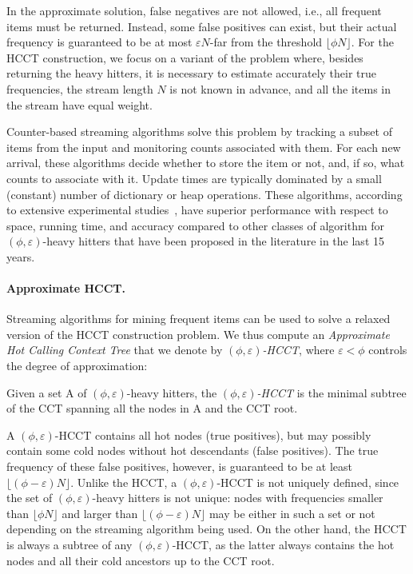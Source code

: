 \noindent In the approximate solution, false negatives are not allowed, i.e., all frequent items must be returned. Instead, some false positives can exist, but their actual frequency is guaranteed to be at most $\varepsilon N$-far from the threshold $\lfloor\phi N\rfloor$. For the HCCT construction, we focus on a variant of the problem where, besides returning the heavy hitters, it is necessary to estimate accurately their true frequencies, the stream length $N$ is not known in advance, and all the items in the stream have equal weight.

Counter-based streaming algorithms solve this problem by tracking a subset of items from the input and monitoring counts associated with them. For each new arrival, these algorithms decide whether to store the item or not, and, if so, what counts to associate with it. Update times are typically dominated by a small (constant) number of dictionary or heap operations. These algorithms, according to extensive experimental studies~\cite{Cormode08,Manerikar2009}, have superior performance with respect to space, running time, and accuracy compared to other classes of algorithm for $(\phi,\varepsilon)$-heavy hitters that have been proposed in the literature in the last 15 years.

\paragraph*{Approximate HCCT.} Streaming algorithms for mining frequent items can be used to solve a relaxed version of the HCCT construction problem. We thus compute an {\em Approximate Hot Calling Context Tree} that we denote by {\em $(\phi,\varepsilon)$-HCCT}, where $\varepsilon<\phi$ controls the degree of approximation:

\begin{definition}
Given a set A of $(\phi,\varepsilon)$-heavy hitters, the {\em $(\phi,\varepsilon)$-HCCT} is the minimal subtree of the CCT spanning all the nodes in A and the CCT root.
\end{definition}

\noindent A $(\phi,\varepsilon)$-HCCT contains all hot nodes (true positives), but may possibly contain some cold nodes without hot descendants (false positives). The true frequency of these false positives, however, is guaranteed to be at least $\lfloor(\phi-\varepsilon) N\rfloor$. Unlike the HCCT, a $(\phi,\varepsilon)$-HCCT is not uniquely defined, since the set of $(\phi,\varepsilon)$-heavy hitters is not unique: nodes with frequencies smaller than $\lfloor\phi N\rfloor$ and larger than $\lfloor(\phi-\varepsilon) N\rfloor$ may be either in such a set or not depending on the streaming algorithm being used. On the other hand, the HCCT is always a subtree of any $(\phi,\varepsilon)$-HCCT, as the latter always contains the hot nodes and all their cold ancestors up to the CCT root.

